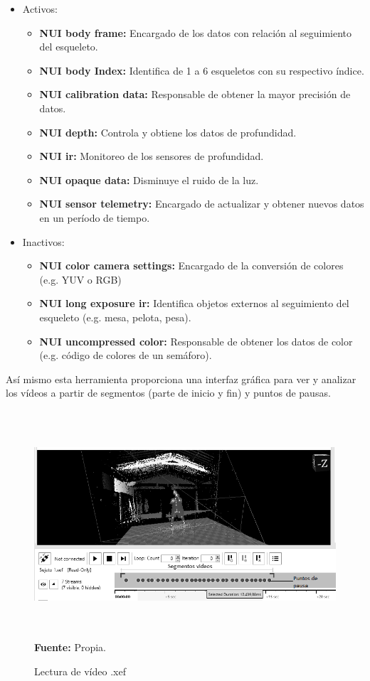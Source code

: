 \begin{itemize}
\item Activos:
\begin{itemize}
\item \textbf{NUI body frame:} Encargado de los datos con relaci\'on al seguimiento del esqueleto.
\item \textbf{NUI body Index:} Identifica de 1 a 6 esqueletos con su respectivo \'indice.
\item \textbf{NUI calibration data:} Responsable de obtener la mayor precisi\'on de datos.
\item \textbf{NUI depth:} Controla y obtiene los datos de profundidad.
\item \textbf{NUI ir:} Monitoreo de los sensores de profundidad.
\item \textbf{NUI opaque data:} Disminuye el ruido de la luz.
\item \textbf{NUI sensor telemetry:} Encargado de actualizar y obtener nuevos datos en un per\'iodo de tiempo.
\end{itemize}
\item Inactivos:
\begin{itemize}
\item \textbf{NUI color camera settings:} Encargado de la conversi\'on de colores (e.g. YUV o RGB)
\item \textbf{NUI long exposure ir:} Identifica  objetos externos al seguimiento del esqueleto (e.g. mesa, pelota, pesa).
\item \textbf{NUI uncompressed color:} Responsable de obtener los datos de color (e.g. c\'odigo de colores de un sem\'aforo).
\end{itemize}
\end{itemize}
As\'i mismo esta herramienta proporciona una interfaz gr\'afica para ver y analizar los v\'ideos a partir de segmentos (parte de inicio y fin) y puntos de pausas.
\begin{figure}[H]
	\caption{Lectura de v\'ideo .xef }
	\label{fig:readVideoXEF}
	\centering
	\includegraphics[width=460px,height=320px]{graphics/readVideo.PNG} \\
	\textbf{Fuente:} Propia.
\end{figure} 
